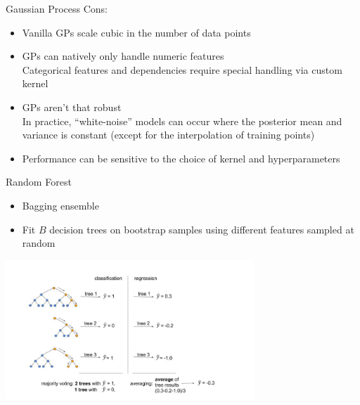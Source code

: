 \documentclass[11pt,compress,t,notes=noshow, xcolor=table]{beamer}
\begin{document}
\begin{vbframe}{Gaussian Process}
Cons:
\begin{itemize}
  \item Vanilla GPs scale cubic in the number of data points
  \item GPs can natively only handle numeric features\\
    Categorical features and dependencies require special handling via custom kernel
  \item GPs aren't that robust\\
    In practice, \enquote{white-noise} models can occur where the posterior mean and variance is constant (except for the interpolation of training points)
  \item Performance can be sensitive to the choice of kernel and hyperparameters
\end{itemize}

\end{vbframe}

\begin{frame}{Random Forest}

\begin{itemize}
    \item Bagging ensemble
    \item Fit $B$ decision trees on bootstrap samples using different features sampled at random
\end{itemize}

\begin{center}
  \includegraphics[width = 0.7\textwidth]{slides/010-bayesian-optimization/figure_man/random_forests.jpg}
\end{center}

\end{frame}
\end{document}
